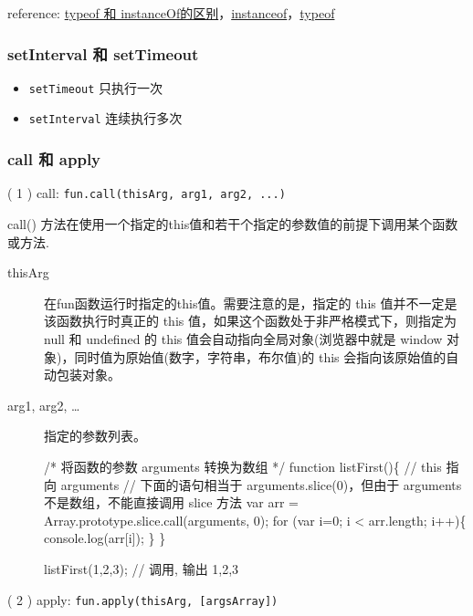 reference: \href{http://segmentfault.com/a/1190000000730982}{typeof 和 instanceOf的区别}，\href{https://developer.mozilla.org/zh-CN/docs/Web/JavaScript/Reference/Operators/instanceof}{instanceof}，\href{https://developer.mozilla.org/zh-CN/docs/Web/JavaScript/Reference/Operators/typeof}{typeof}

\subsubsection{setInterval 和 setTimeout}\hypertarget{setinterval--settimeout}{}\label{setinterval--settimeout}

\begin{itemize}
\item \texttt{setTimeout} 只执行一次
\item \texttt{setInterval} 连续执行多次
\end{itemize}

\subsubsection{call 和 apply}\hypertarget{call--apply}{}\label{call--apply}

( 1 ) call: \texttt{fun.call(thisArg, arg1, arg2, ...)}

call() 方法在使用一个指定的this值和若干个指定的参数值的前提下调用某个函数或方法.

\begin{description}
\item[thisArg] 在fun函数运行时指定的this值。需要注意的是，指定的 this 值并不一定是该函数执行时真正的 this 值，如果这个函数处于非严格模式下，则指定为 null 和 undefined 的 this 值会自动指向全局对象(浏览器中就是 window 对象)，同时值为原始值(数字，字符串，布尔值)的 this 会指向该原始值的自动包装对象。



\item[arg1, arg2, \ldots{}] 指定的参数列表。


/* 将函数的参数 arguments 转换为数组 */
  function listFirst()\{
      // this 指向 arguments
      // 下面的语句相当于 arguments.slice(0)，但由于 arguments 不是数组，不能直接调用 slice 方法
      var arr = Array.prototype.slice.call(arguments, 0);
      for (var i=0; i \textless{} arr.length; i++)\{
          console.log(arr[i]);
      \}
  \}

listFirst(1,2,3); // 调用, 输出 1,2,3
\end{description}

( 2 ) apply: \texttt{fun.apply(thisArg, [argsArray])}

